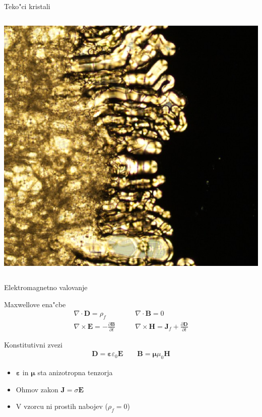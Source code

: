 \documentclass{beamer}
\newcommand{\odvod}[2]{\frac{\partial #1}{\partial #2}}
\renewcommand{\vec}{\mathbf}
\newcommand{\eps}{\varepsilon}
\begin{document}
\begin{frame}{Teko"ci kristali}
\begin{columns}[t]
    \includegraphics[width=\textwidth]{./Slike/tvorjenje2}
    
  \end{columns}
\end{frame}

\begin{frame}{Elektromagnetno valovanje}

\begin{block}{Maxwellove ena"cbe}
\begin{equation*}
\begin{aligned}
 \nabla \cdot \vec D = \rho_f & \qquad \nabla \cdot \vec B = 0 \\
 \nabla \times \vec E = -\odvod{\vec B}{t} & \qquad \nabla \times \vec H = \vec J_f + \odvod{\vec D}{t}
\end{aligned} 
\end{equation*}
\end{block}

\begin{block}{Konstitutivni zvezi}
\begin{equation*}
\begin{aligned}
\vec D = \boldsymbol\varepsilon \varepsilon_0 \vec E \qquad \vec B = \boldsymbol \mu \mu_0 \vec H
\end{aligned} 
\end{equation*}
\end{block}

\begin{itemize}
 \item $\boldsymbol\eps$ in $\boldsymbol\mu$ sta anizotropna tenzorja
 \item Ohmov zakon $\vec J = \sigma \vec E$
 \item V vzorcu ni prostih nabojev ($\rho_f = 0$)
\end{itemize}

\end{frame}
\end{document}
